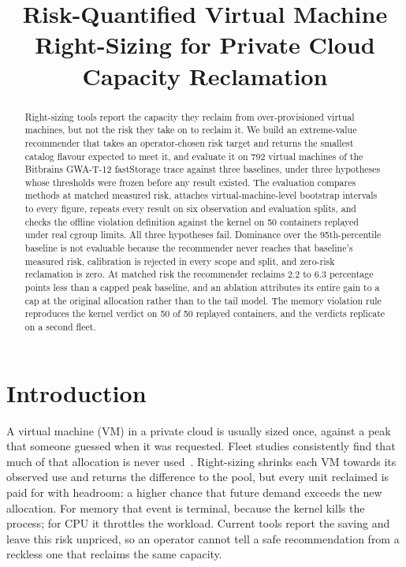 \documentclass[conference]{IEEEtran}
\begin{document}
\title{Risk-Quantified Virtual Machine Right-Sizing for Private Cloud Capacity Reclamation}

\author{
\and
{}
}

\maketitle

\begin{abstract}
Right-sizing tools report the capacity they reclaim from over-provisioned virtual machines, but not the risk they take on to reclaim it. We build an extreme-value recommender that takes an operator-chosen risk target and returns the smallest catalog flavour expected to meet it, and evaluate it on 792 virtual machines of the Bitbrains GWA-T-12 fastStorage trace against three baselines, under three hypotheses whose thresholds were frozen before any result existed. The evaluation compares methods at matched measured risk, attaches virtual-machine-level bootstrap intervals to every figure, repeats every result on six observation and evaluation splits, and checks the offline violation definition against the kernel on 50 containers replayed under real cgroup limits. All three hypotheses fail. Dominance over the 95th-percentile baseline is not evaluable because the recommender never reaches that baseline's measured risk, calibration is rejected in every scope and split, and zero-risk reclamation is zero. At matched risk the recommender reclaims 2.2 to 6.3 percentage points less than a capped peak baseline, and an ablation attributes its entire gain to a cap at the original allocation rather than to the tail model. The memory violation rule reproduces the kernel verdict on 50 of 50 replayed containers, and the verdicts replicate on a second fleet.
\end{abstract}

\section{Introduction}
A virtual machine (VM) in a private cloud is usually sized once, against a peak that someone guessed when it was requested. Fleet studies consistently find that much of that allocation is never used~\cite{qin2023,wacloud2025}. Right-sizing shrinks each VM towards its observed use and returns the difference to the pool, but every unit reclaimed is paid for with headroom: a higher chance that future demand exceeds the new allocation. For memory that event is terminal, because the kernel kills the process; for CPU it throttles the workload. Current tools report the saving and leave this risk unpriced, so an operator cannot tell a safe recommendation from a reckless one that reclaims the same capacity.
\end{document}
